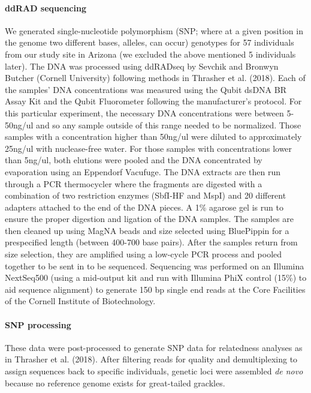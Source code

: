 \documentclass[
]{article}
\begin{document}
\hypertarget{ddrad-sequencing}{%
\paragraph{ddRAD sequencing}\label{ddrad-sequencing}}

We generated single-nucleotide polymorphism (SNP; where at a given
position in the genome two different bases, alleles, can occur)
genotypes for 57 individuals from our study site in Arizona (we excluded
the above mentioned 5 individuals later). The DNA was processed using
ddRADseq by Sevchik and Bronwyn Butcher (Cornell University) following
methods in Thrasher et al. (2018). Each of the samples' DNA
concentrations was measured using the Qubit dsDNA BR Assay Kit and the
Qubit Fluorometer following the manufacturer's protocol. For this
particular experiment, the necessary DNA concentrations were between
5-50ng/ul and so any sample outside of this range needed to be
normalized. Those samples with a concentration higher than 50ng/ul were
diluted to approximately 25ng/ul with nuclease-free water. For those
samples with concentrations lower than 5ng/ul, both elutions were pooled
and the DNA concentrated by evaporation using an Eppendorf Vacufuge. The
DNA extracts are then run through a PCR thermocycler where the fragments
are digested with a combination of two restriction enzymes (SbfI-HF and
MspI) and 20 different adapters attached to the end of the DNA pieces. A
1\% agarose gel is run to ensure the proper digestion and ligation of
the DNA samples. The samples are then cleaned up using MagNA beads and
size selected using BluePippin for a prespecified length (between
400-700 base pairs). After the samples return from size selection, they
are amplified using a low-cycle PCR process and pooled together to be
sent in to be sequenced. Sequencing was performed on an Illumina
NextSeq500 (using a mid-output kit and run with Illumina PhiX control
(15\%) to aid sequence alignment) to generate 150 bp single end reads at
the Core Facilities of the Cornell Institute of Biotechnology.

\hypertarget{snp-processing}{%
\paragraph{SNP processing}\label{snp-processing}}

These data were post-processed to generate SNP data for relatedness
analyses as in Thrasher et al. (2018). After filtering reads for quality
and demultiplexing to assign sequences back to specific individuals,
genetic loci were assembled \emph{de novo} because no reference genome
exists for great-tailed grackles.
\end{document}

